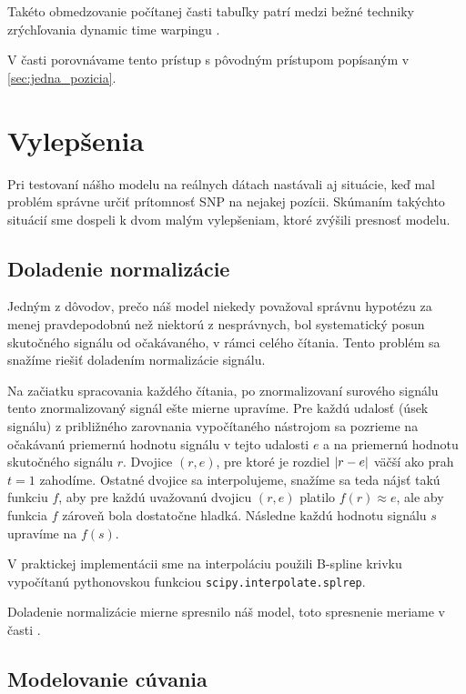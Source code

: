 Takéto obmedzovanie počítanej časti tabuľky patrí medzi bežné techniky zrýchľovania
dynamic time warpingu \cite{FastDTW}.

V časti  porovnávame tento prístup s pôvodným prístupom popísaným v \ref{sec:jedna_pozicia}.


\section{Vylepšenia}

Pri testovaní nášho modelu na reálnych dátach nastávali aj situácie, keď mal problém správne určiť 
prítomnosť SNP na nejakej pozícii. Skúmaním takýchto situácií sme dospeli k dvom malým vylepšeniam,
ktoré zvýšili presnosť modelu.

\subsection{Doladenie normalizácie}

Jedným z dôvodov, prečo náš model niekedy považoval správnu hypotézu za menej pravdepodobnú než
niektorú z nesprávnych, bol systematický posun skutočného signálu od očakávaného, v rámci celého
čítania. Tento problém sa snažíme riešiť doladením normalizácie signálu.

Na začiatku spracovania každého čítania, po znormalizovaní surového signálu
 tento znormalizovaný signál ešte mierne upravíme.
Pre každú udalosť (úsek signálu) z približného zarovnania vypočítaného nástrojom \resquiggle{} sa
pozrieme na očakávanú priemernú hodnotu signálu v tejto udalosti $e$ a na priemernú hodnotu skutočného
signálu $r$. Dvojice $(r, e)$, pre ktoré je rozdiel $\abs*{r-e}$ väčší ako prah $t=1$ zahodíme.
Ostatné dvojice sa interpolujeme, snažíme sa teda nájsť takú funkciu $f$, aby pre každú uvažovanú
dvojicu $(r, e)$ platilo $f(r) \approx e$, ale aby funkcia $f$ zároveň bola dostatočne hladká.
Následne každú hodnotu signálu $s$ upravíme na $f(s)$.


V praktickej implementácii sme na interpoláciu použili B-spline krivku vypočítanú pythonovskou
funkciou \texttt{scipy.interpolate.splrep}.

Doladenie normalizácie mierne spresnilo náš model, toto spresnenie meriame v časti .

\subsection{Modelovanie cúvania}

